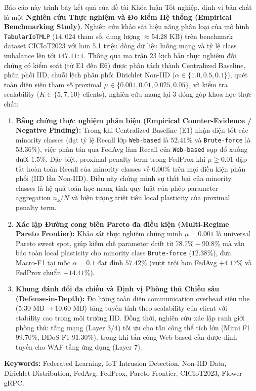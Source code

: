 Báo cáo này trình bày kết quả của đề tài Khóa luận Tốt nghiệp, định vị bản chất là một \textbf{Nghiên cứu Thực nghiệm và Đo kiểm Hệ thống (Empirical Benchmarking Study)}. Nghiên cứu khảo sát hiệu năng phân loại của mô hình \texttt{TabularIoTMLP} ($14,024$ tham số, dung lượng $\approx 54.28\text{ KB}$) trên benchmark dataset CICIoT2023 với hơn 5.1 triệu dòng dữ liệu luồng mạng và tỷ lệ class imbalance lên tới $147.11:1$. Thông qua ma trận 23 kịch bản thực nghiệm đối chứng có kiểm soát (từ E1 đến E6) được phân tách thành Centralized Baseline, phân phối IID, chuỗi lệch phân phối Dirichlet Non-IID ($\alpha \in \{1.0, 0.5, 0.1\}$), quét toàn diện siêu tham số proximal $\mu \in \{0.001, 0.01, 0.025, 0.05\}$, và kiểm tra scalability ($K \in \{5, 7, 10\}$ clients), nghiên cứu mang lại 3 đóng góp khoa học thực chất:
\begin{enumerate}
    \item \textbf{Bằng chứng thực nghiệm phản biện (Empirical Counter-Evidence / Negative Finding):} Trong khi Centralized Baseline (E1) nhận diện tốt các minority classes (đạt tỷ lệ Recall lớp \texttt{Web-based} là $52.41\%$ và \texttt{Brute-force} là $53.36\%$), việc phân tán qua FedAvg làm Recall của \texttt{Web-based} sụp đổ xuống dưới $1.5\%$. Đặc biệt, proximal penalty term trong FedProx khi $\mu \ge 0.01$ dập tắt hoàn toàn Recall của minority classes về $0.00\%$ trên mọi điều kiện phân phối (IID lẫn Non-IID). Điều này chứng minh sự thất bại của minority classes là hệ quả toán học mang tính quy luật của phép parameter aggregation $n_k/N$ và hiện tượng triệt tiêu local plasticity của proximal penalty term.
    \item \textbf{Xác lập Đường cong biên Pareto đa điều kiện (Multi-Regime Pareto Frontier):} Khảo sát thực nghiệm chứng minh $\mu = 0.001$ là universal Pareto sweet spot, giúp kiềm chế parameter drift từ $78.7\% - 90.8\%$ mà vẫn bảo toàn local plasticity cho minority class \texttt{Brute-force} ($12.38\%$), đưa Macro-F1 tại mốc $\alpha=0.1$ đạt đỉnh $57.42\%$ (vượt trội hơn FedAvg $+4.17\%$ và FedProx chuẩn $+14.41\%$).
    \item \textbf{Khung đánh đổi đa chiều và Định vị Phòng thủ Chiều sâu (Defense-in-Depth):} Đo lường toàn diện communication overhead siêu nhẹ ($5.30\text{ MB} \to 10.60\text{ MB}$) tăng tuyến tính theo scalability của client với stability cao trong môi trường IID. Đồng thời, nghiên cứu xác lập ranh giới phòng thủ: tầng mạng (Layer 3/4) tối ưu cho tấn công thể tích lớn (Mirai F1 $99.70\%$, DDoS F1 $91.30\%$), trong khi tấn công Web-based cần được định tuyến cho WAF tầng ứng dụng (Layer 7).
\end{enumerate}

\textbf{Keywords:} Federated Learning, IoT Intrusion Detection, Non-IID Data, Dirichlet Distribution, FedAvg, FedProx, Pareto Frontier, CICIoT2023, Flower gRPC.

\newpage
